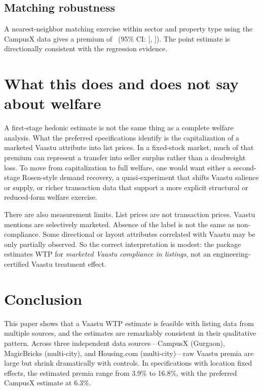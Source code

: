 \documentclass[11pt]{article}
\begin{document}


\subsection{Matching robustness}

A nearest-neighbor matching exercise within sector and property type using the CampusX data gives a premium of \MatchingPremiumPct\ (95\% CI: [\MatchingCILowPct, \MatchingCIHighPct]). The point estimate is directionally consistent with the regression evidence.



\section{What this does and does not say about welfare}

A first-stage hedonic estimate is not the same thing as a complete welfare analysis. What the preferred specifications identify is the capitalization of a marketed Vaastu attribute into list prices. In a fixed-stock market, much of that premium can represent a transfer into seller surplus rather than a deadweight loss. To move from capitalization to full welfare, one would want either a second-stage Rosen-style demand recovery, a quasi-experiment that shifts Vaastu salience or supply, or richer transaction data that support a more explicit structural or reduced-form welfare exercise.

There are also measurement limits. List prices are not transaction prices. Vaastu mentions are selectively marketed. Absence of the label is not the same as non-compliance. Some directional or layout attributes correlated with Vaastu may be only partially observed. So the correct interpretation is modest: the package estimates WTP for \emph{marketed Vaastu compliance in listings}, not an engineering-certified Vaastu treatment effect.

\section{Conclusion}

This paper shows that a Vaastu WTP estimate is feasible with listing data from multiple sources, and the estimates are remarkably consistent in their qualitative pattern. Across three independent data sources---CampusX (Gurgaon), MagicBricks (multi-city), and Housing.com (multi-city)---raw Vaastu premia are large but shrink dramatically with controls. In specifications with location fixed effects, the estimated premia range from 3.9\% to 16.8\%, with the preferred CampusX estimate at 6.3\%.
\end{document}
